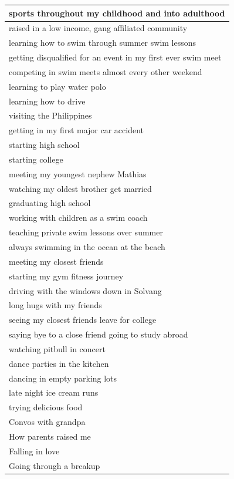 \documentclass[
  .7em,
  letterpaper,
  DIV=11,
  numbers=noendperiod]{scrartcl}
\begin{document}
\begin{table}
\begin{tabular}{l}
\hline
sports throughout my childhood and into adulthood\\
\hline
raised in a low income, gang affiliated community\\
\hline
learning how to swim through summer swim lessons\\
\hline
getting disqualified for an event in my first ever swim meet\\
\hline
competing in swim meets almost every other weekend\\
\hline
learning to play water polo\\
\hline
learning how to drive\\
\hline
visiting the Philippines\\
\hline
getting in my first major car accident\\
\hline
starting high school\\
\hline
starting college\\
\hline
meeting my youngest nephew Mathias\\
\hline
watching my oldest brother get married\\
\hline
graduating high school\\
\hline
working with children as a swim coach\\
\hline
teaching private swim lessons over summer\\
\hline
always swimming in the ocean at the beach\\
\hline
meeting my closest friends\\
\hline
starting my gym fitness journey\\
\hline
driving with the windows down in Solvang\\
\hline
long hugs with my friends\\
\hline
seeing my closest friends leave for college\\
\hline
saying bye to a close friend going to study abroad\\
\hline
watching pitbull in concert\\
\hline
dance parties in the kitchen\\
\hline
dancing in empty parking lots\\
\hline
late night ice cream runs\\
\hline
trying delicious food\\
\hline
Convos with grandpa\\
\hline
How parents raised me\\
\hline
Falling in love\\
\hline
Going through a breakup\\

\end{tabular}
\end{table}
\end{document}
